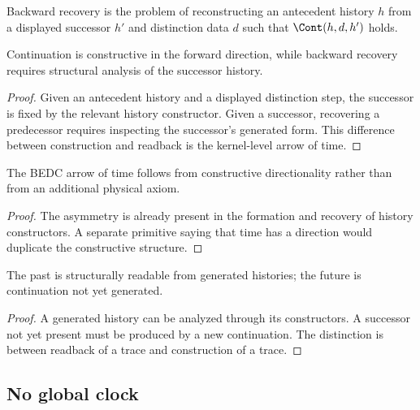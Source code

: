 \begin{definition}
\label{def:philosophy-backward-recovery}
Backward recovery is the problem of reconstructing an antecedent
history \(h\) from a displayed successor \(h'\) and distinction data
\(d\) such that \(\Cont(h,d,h')\) holds.
\end{definition}

\begin{theorem}
\label{thm:philosophy-continuation-time-asymmetric}
Continuation is constructive in the forward direction, while backward
recovery requires structural analysis of the successor history.
\end{theorem}
\begin{proof}
Given an antecedent history and a displayed distinction step, the
successor is fixed by the relevant history constructor. Given a
successor, recovering a predecessor requires inspecting the successor's
generated form. This difference between construction and readback is
the kernel-level arrow of time.
\end{proof}

\begin{corollary}
\label{cor:philosophy-time-arrow-not-physical-postulate}
The BEDC arrow of time follows from constructive directionality rather
than from an additional physical axiom.
\end{corollary}
\begin{proof}
The asymmetry is already present in the formation and recovery of
history constructors. A separate primitive saying that time has a
direction would duplicate the constructive structure.
\end{proof}

\begin{corollary}
\label{cor:philosophy-past-readback-future-construction}
The past is structurally readable from generated histories; the future
is continuation not yet generated.
\end{corollary}
\begin{proof}
A generated history can be analyzed through its constructors. A
successor not yet present must be produced by a new continuation. The
distinction is between readback of a trace and construction of a trace.
\end{proof}

\subsection{No global clock}
\label{subsec:philosophy-no-global-clock}

